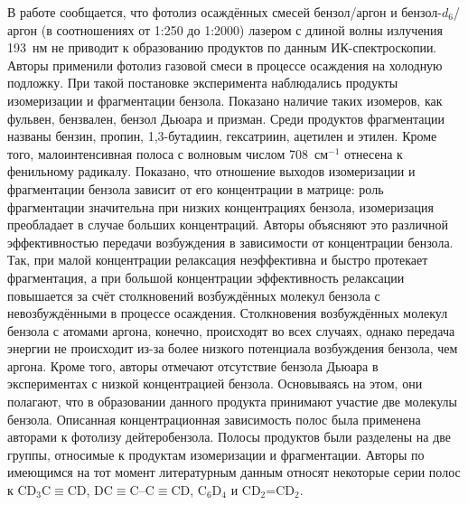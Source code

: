{В работе \cite{Laboy1993} сообщается, что фотолиз осаждённых смесей бензол/аргон и бензол-$d_6$/аргон (в соотношениях от 1:250 до 1:2000) лазером с длиной волны излучения 193~нм не приводит к образованию продуктов по данным ИК-спектроскопии.
Авторы применили фотолиз газовой смеси в процессе осаждения на холодную подложку. При такой постановке эксперимента наблюдались продукты изомеризации и фрагментации бензола.
Показано наличие таких изомеров, как фульвен, бензвален, бензол Дьюара и призман. Среди продуктов фрагментации названы бензин, пропин, 1,3-бутадиин, 
гексатриин, ацетилен и этилен. Кроме того, малоинтенсивная полоса с волновым числом 708~см$^{-1}$ отнесена к фенильному радикалу. Показано, что отношение выходов 
изомеризации и фрагментации бензола зависит от его концентрации в матрице: роль фрагментации значительна при низких концентрациях бензола, изомеризация преобладает в случае больших концентраций.  
Авторы объясняют это различной эффективностью передачи возбуждения в зависимости от концентрации бензола. 
Так, при малой концентрации релаксация неэффективна и быстро протекает
фрагментация, а при большой концентрации эффективность релаксации повышается за счёт столкновений возбуждённых молекул бензола с невозбуждёнными в процессе осаждения. 
Столкновения возбуждённых 
молекул бензола с атомами аргона, конечно, происходят во всех случаях, однако передача энергии не происходит из-за более низкого потенциала 
возбуждения бензола, чем аргона. Кроме того, авторы отмечают отсутствие бензола Дьюара
в экспериментах с низкой концентрацией бензола. Основываясь на этом, они полагают, что в образовании данного продукта принимают участие две молекулы бензола.
Описанная концентрационная зависимость полос была применена авторами к фотолизу дейтеробензола. Полосы продуктов были разделены на две группы, относимые к продуктам изомеризации и фрагментации.
Авторы по имеющимся на тот момент литературным данным относят некоторые серии полос к CD$_3$C$\equiv$CD, DC$\equiv$C--C$\equiv$CD, C$_6$D$_4$ и CD$_2$=CD$_2$. 

}
